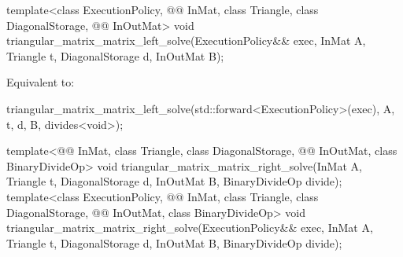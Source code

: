 \begin{itemdecl}
  template<class ExecutionPolicy,
           @@ InMat, class Triangle, class DiagonalStorage, @@ InOutMat>
    void triangular_matrix_matrix_left_solve(ExecutionPolicy&& exec,
                                             InMat A, Triangle t, DiagonalStorage d,
                                             InOutMat B);
\end{itemdecl}

\begin{itemdescr}
\pnum
\effects
Equivalent to:
\begin{codeblock}
triangular_matrix_matrix_left_solve(std::forward<ExecutionPolicy>(exec),
                                    A, t, d, B, divides<void>{});
\end{codeblock}
\end{itemdescr}

\begin{itemdecl}
template<@@ InMat, class Triangle, class DiagonalStorage,
         @@ InOutMat, class BinaryDivideOp>
  void triangular_matrix_matrix_right_solve(InMat A, Triangle t, DiagonalStorage d,
                                            InOutMat B, BinaryDivideOp divide);
template<class ExecutionPolicy, @@ InMat, class Triangle, class DiagonalStorage,
         @@ InOutMat, class BinaryDivideOp>
  void triangular_matrix_matrix_right_solve(ExecutionPolicy&& exec,
                                            InMat A, Triangle t, DiagonalStorage d,
                                            InOutMat B, BinaryDivideOp divide);
\end{itemdecl}

